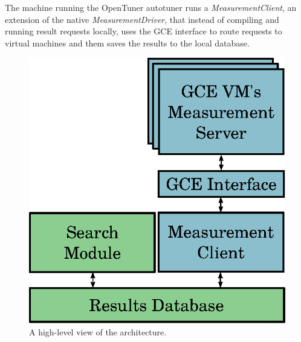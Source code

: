 \documentclass[a4paper, 12pt]{article}
\begin{document}
The machine running the OpenTuner autotuner runs a \emph{MeasurementClient},
an extension of the native \emph{MeasurementDriver}, that instead of
compiling and running result requests locally, uses the GCE interface to
route requests to virtual machines and them saves the results to the local
database.

\begin{figure}[htpb]
    \centering
    \begin{minipage}{.45\textwidth}
        \centering
        \includegraphics[scale=.64]{high-level-implementation}
        \caption{A high-level view of the architecture.}
        \label{fig:high-level}
    \end{minipage}%
    \hfill
    \begin{minipage}{.45\textwidth}
        \centering

\end{minipage}
\end{figure}
\end{document}
